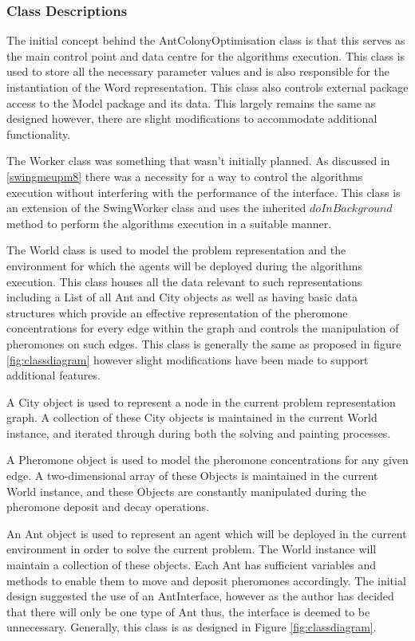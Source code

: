 \subsubsection{Class Descriptions}
\label{model:classdef}

The initial concept behind the AntColonyOptimisation class is that this serves as the main control point and data centre for the algorithms execution. This class is used to store all the necessary parameter values and is also responsible for the instantiation of the Word representation. This class also controls external package access to the Model package and its data. This largely remains the same as designed however, there are slight modifications to accommodate additional functionality.

The Worker class was something that wasn’t initially planned. As discussed in \ref{swingmeupm8} there was a necessity for a way to control the algorithms execution without interfering with the performance of the interface. This class is an extension of the SwingWorker class and uses the inherited $doInBackground$ method to perform the algorithms execution in a suitable manner. 

The World class is used to model the problem representation and the environment for which the agents will be deployed during the algorithms execution. This class houses all the data relevant to such representations including a List of all Ant and City objects as well as having basic data structures which provide an effective representation of the pheromone concentrations for every edge within the graph and controls the manipulation of pheromones on such edges. This class is generally the same as proposed in figure \ref{fig:classdiagram} however slight modifications have been made to support additional features.

A City object is used to represent a node in the current problem representation graph. A collection of these City objects is maintained in the current World instance, and iterated through during both the solving and painting processes.

A Pheromone object is used to model the pheromone concentrations for any given edge. A two-dimensional array of these Objects is maintained in the current World instance, and these Objects are constantly manipulated during the pheromone deposit and decay operations. 

An Ant object is used to represent an agent which will be deployed in the current environment in order to solve the current problem. The World instance will maintain a collection of these objects. Each Ant has sufficient variables and methods to enable them to move and deposit pheromones accordingly. The initial design suggested the use of an AntInterface, however as the author has decided that there will only be one type of Ant thus, the interface is deemed to be unnecessary. Generally, this class is as designed in Figure \ref{fig:classdiagram}.

